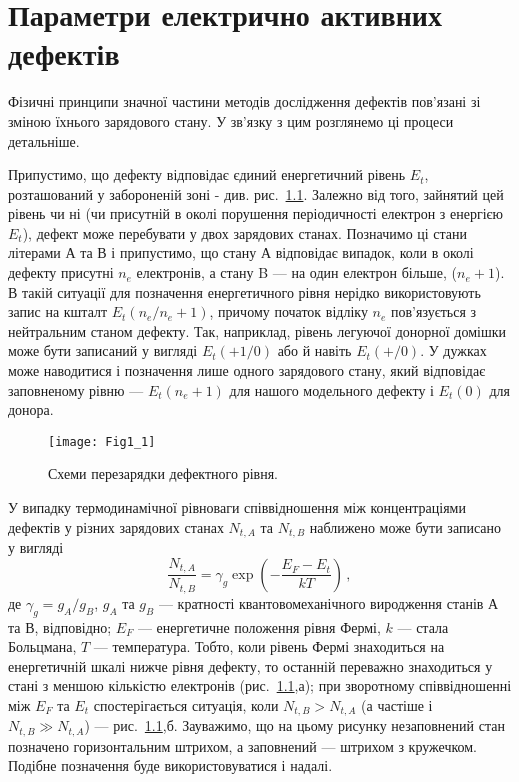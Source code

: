 \chapter{Параметри електрично активних \\ дефектів}\label{chapLevels}
Фізичні принципи значної частини методів дослідження дефектів
пов'язані зі зміною їхнього зарядового стану.
У зв'язку з цим розглянемо ці процеси детальніше.

Припустимо, що дефекту відповідає єдиний енергетичний рівень $E_t$,
розташований у забороненій зоні - див. рис.~\ref{F11}.
Залежно від того, зайнятий цей рівень чи ні (чи присутній в околі
порушення періодичності електрон з енергією $E_t$),
дефект може перебувати у двох зарядових станах.
Позначимо ці стани літерами А та В і припустимо,
що стану А відповідає випадок, коли в околі дефекту присутні $n_e$
електронів, а стану B --- на один електрон більше, ($n_e+1$).
В такій ситуації для позначення енергетичного рівня
нерідко використовують запис на кшталт $E_t(n_e/n_e+1)$,
причому початок відліку $n_e$ пов'язується з нейтральним станом
дефекту.
Так, наприклад, рівень легуючої донорної домішки
може бути записаний у вигляді $E_t(+1/0)$ або й навіть $E_t(+/0)$.
У дужках може наводитися і позначення лише одного зарядового стану,
який відповідає заповненому рівню ---  $E_t(n_e+1)$ для нашого модельного дефекту
і $E_t(0)$ для донора.

\begin{figure}[b]
\center
\vspace{-5mm}
\texttt{[image: Fig1\_1]}
\vspace{-3mm}
\caption{Схеми перезарядки дефектного рівня.}
\vspace{-3mm}
\label{F11}
\end{figure}

У випадку термодинамічної рівноваги співвідношення між концентраціями
дефектів у різних зарядових станах $N_{t,A}$ та $N_{t,B}$
наближено може бути записано у вигляді
\begin{equation}
\label{NbNa}
 \frac{N_{t,A}}{N_{t,B}}=\gamma_g\exp\left(-\frac{E_F-E_t}{kT}\right)\,,
\end{equation}
де $\gamma_g=g_{A}/g_{B}$,
 $g_{A}$ та $g_{B}$ --- кратності квантовомеханічного виродження станів А та В,
відповідно;
$E_F$ --- енергетичне положення рівня Фермі,
$k$ --- стала Больцмана,
$T$ --- температура.
Тобто, коли рівень Фермі знаходиться на енергетичній шкалі нижче рівня дефекту,
то останній переважно знаходиться у стані з меншою кількістю електронів (рис.~\ref{F11},а);
при зворотному співвідношенні між  $E_F$ та $E_t$  спостерігається ситуація,
коли $N_{t,B}>N_{t,A}$ (а частіше і $N_{t,B}\gg N_{t,A}$) --- рис.~\ref{F11},б.
Зауважимо, що на цьому рисунку незаповнений стан позначено горизонтальним штрихом,
а заповнений --- штрихом з кружечком.
Подібне позначення буде використовуватися і надалі.

